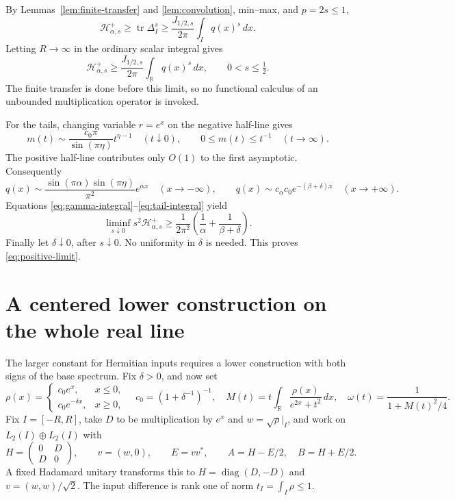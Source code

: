 \documentclass[11pt]{article}
\numberwithin{equation}{section}
\newcommand{\tr}{\operatorname{tr}}
\newcommand{\R}{\mathbb R}
\newcommand{\cH}{\mathcal H}
\begin{document}
By Lemmas~\ref{lem:finite-transfer} and \ref{lem:convolution}, min--max,
and $p=2s\le1$,
\[
 \cH^+_{\alpha,s}\ge\tr\Delta_I^s
       \ge\frac{J_{1/2,s}}{2\pi}\int_I q(x)^s\,dx.
\]
Letting $R\to\infty$ in the ordinary scalar integral gives
\begin{equation}\label{eq:psd-lower-bound}
 \cH^+_{\alpha,s}
       \ge\frac{J_{1/2,s}}{2\pi}\int_\R q(x)^s\,dx,
       \qquad 0<s\le\tfrac12.
\end{equation}
The finite transfer is done before this limit, so no functional calculus
of an unbounded multiplication operator is invoked.

For the tails, changing variable $r=e^x$ on the negative half-line gives
\[
 m(t)\sim\frac{c_0\pi}{\sin(\pi\eta)}t^{\eta-1}
       \quad(t\downarrow0),\qquad
 0\le m(t)\le t^{-1}\quad(t\to\infty).
\]
The positive half-line contributes only $O(1)$ to the first asymptotic.
Consequently
\[
 q(x)\sim\frac{\sin(\pi\alpha)\sin(\pi\eta)}{\pi^2}e^{\alpha x}
       \quad(x\to-\infty),\qquad
 q(x)\sim c_\alpha c_0e^{-(\beta+\delta)x}
       \quad(x\to+\infty).
\]
Equations \eqref{eq:gamma-integral}--\eqref{eq:tail-integral} yield
\begin{equation}\label{eq:psd-liminf}
 \liminf_{s\downarrow0}s^2\cH^+_{\alpha,s}
       \ge\frac1{2\pi^2}
                  \left(\frac1\alpha+\frac1{\beta+\delta}\right).
\end{equation}
Finally let $\delta\downarrow0$, after $s\downarrow0$.
No uniformity in $\delta$ is needed. This proves
\eqref{eq:positive-limit}.

\section{A centered lower construction on the whole real line}

The larger constant for Hermitian inputs requires a lower construction
with both signs of the base spectrum. Fix $\delta>0$, and now set
\begin{equation}\label{eq:full-density}
 \rho(x)=\begin{cases}c_0e^x,&x\le0,\\
                      c_0e^{-\delta x},&x\ge0,
        \end{cases}
 \quad c_0=(1+\delta^{-1})^{-1},\quad
 M(t)=t\int_\R\frac{\rho(x)}{e^{2x}+t^2}\,dx,
 \quad \omega(t)=\frac1{1+M(t)^2/4}.
\end{equation}
Fix $I=[-R,R]$, take $D$ to be multiplication by $e^x$ and
$w=\sqrt\rho|_I$, and work on $L_2(I)\oplus L_2(I)$ with
\begin{equation}\label{eq:central-endpoints}
 H=\begin{pmatrix}0&D\\D&0\end{pmatrix},\qquad
 v=(w,0),\qquad E=vv^*,\qquad A=H-E/2,\quad B=H+E/2.
\end{equation}
A fixed Hadamard unitary transforms this to
$H=\operatorname{diag}(D,-D)$ and $v=(w,w)/\sqrt2$.
The input difference is rank one of norm
$t_I=\int_I\rho\le1$.
\end{document}

